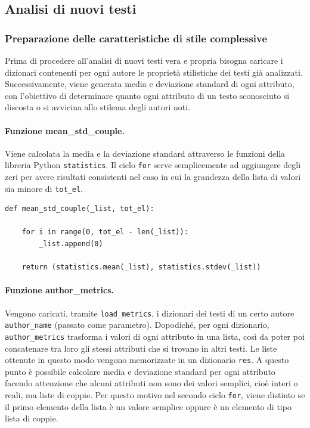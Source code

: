 \documentclass[titlepage]{article}
\begin{document}
\subsection{Analisi di nuovi testi}

\subsubsection{Preparazione delle caratteristiche di stile complessive}
Prima di procedere all'analisi di nuovi testi vera e propria bisogna caricare i dizionari contenenti per ogni autore le proprietà stilistiche dei testi già analizzati. Successivamente, viene generata media e deviazione standard di ogni attributo, con l'obiettivo di determinare quanto ogni attributo di un testo sconosciuto si discosta o si avvicina allo stilema degli autori noti.

\paragraph{Funzione mean\_std\_couple.}
Viene calcolata la media e la deviazione standard attraverso le funzioni della libreria Python \texttt{statistics}. Il ciclo \texttt{for} serve semplicemente ad aggiungere degli zeri per avere risultati consistenti nel caso in cui la grandezza della lista di valori sia minore di \texttt{tot\_el}.
\begin{verbatim}
def mean_std_couple(_list, tot_el):

    for i in range(0, tot_el - len(_list)):
        _list.append(0)

    return (statistics.mean(_list), statistics.stdev(_list))
\end{verbatim}

\paragraph{Funzione author\_metrics.}
Vengono caricati, tramite \texttt{load\_metrics}, i dizionari dei testi di un certo autore \texttt{author\_name} (passato come parametro). Dopodiché, per ogni dizionario, \texttt{author\_metrics} trasforma i valori di ogni attributo in una lista, così da poter poi concatenare tra loro gli stessi attributi che si trovano in altri testi. Le liste ottenute in questo modo vengono memorizzate in un dizionario \texttt{res}. A questo punto è possibile calcolare media e deviazione standard per ogni attributo facendo attenzione che alcuni attributi non sono dei valori semplici, cioè interi o reali, ma liste di coppie. Per questo motivo nel secondo ciclo \texttt{for}, viene distinto se il primo elemento della lista è un valore semplice oppure è un elemento di tipo lista di coppie.
\end{document}
